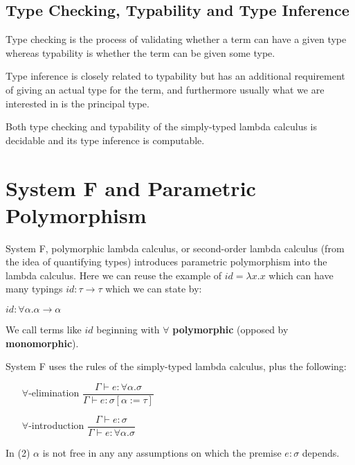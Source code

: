 
\subsection{Type Checking, Typability and Type Inference}

Type checking is the process of validating whether a term can have a given type
whereas typability is whether the term can be given some type.

Type inference is closely related to typability but has an additional requirement of giving an actual type for the term, and furthermore
usually what we are interested in is the principal type.

Both type checking and typability of the simply-typed lambda calculus is decidable and its type inference is computable. %

\section{System F and Parametric Polymorphism} %

System F, polymorphic lambda calculus, or second-order lambda calculus (from the idea of quantifying types) introduces
parametric polymorphism into the lambda calculus. Here we can reuse the example of $id = \lambda x . x$ which can have many typings
$id : \tau \rightarrow \tau$ which we can state by:

$id : \forall \alpha . \alpha \rightarrow \alpha$

We call terms like $id$ beginning with $\forall$ \textbf{polymorphic} (opposed by \textbf{monomorphic}).

System F uses the rules of the simply-typed lambda calculus, plus the following:

\begin{itemize}
    \item[$\forall$-elimination] $\dfrac{\Gamma \vdash e : \forall \alpha . \sigma}{\Gamma \vdash e : \sigma [\alpha := \tau]}$
    \item[$\forall$-introduction] $\dfrac{\Gamma \vdash e : \sigma}{\Gamma \vdash e : \forall \alpha . \sigma}$
\end{itemize}

In (2) $\alpha$ is not free in any any assumptions on which the premise $e : \sigma$ depends. %


